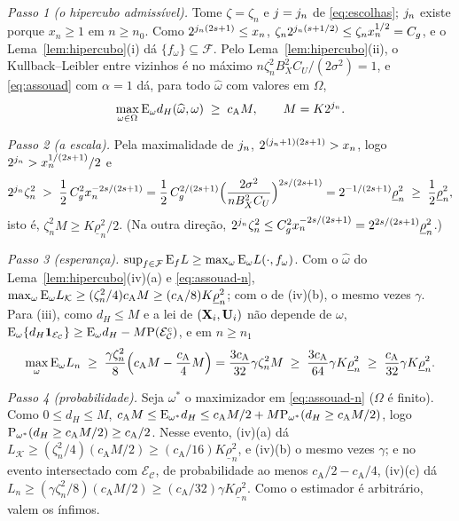 \documentclass[11pt,a4paper]{article}
\newcommand{\Fcal}{\mathcal{F}}
\newcommand{\dH}{d_{H}}
\newcommand{\rlow}{\underline{\rho}_{n}}
\newcommand{\cA}{c_{\mathrm{A}}}
\newcommand{\ECc}{\mathcal{E}_{\mathcal{C}}}
\newcommand{\Lk}{L_{\mathcal{K}}}
\begin{document}
\emph{Passo 1 (o hipercubo admissível).} Tome $\zeta = \zeta_{n}$ e $j =
j_{n}$ de \eqref{eq:escolhas}; $j_{n}$ existe porque $x_{n} \ge 1$ em
$n \ge n_{0}$. Como $2^{j_{n}(2s+1)} \le x_{n}$,
$\zeta_{n}2^{j_{n}(s+1/2)} \le \zeta_{n}x_{n}^{1/2} = C_{g}$, e o
Lema~\ref{lem:hipercubo}(i) dá $\{f_{\omega}\} \subseteq \Fcal$. Pelo
Lema~\ref{lem:hipercubo}(ii), o Kullback--Leibler entre vizinhos é no máximo
$n\zeta_{n}^{2}B_{X}^{2}C_{U}/(2\sigma^{2}) = 1$, e \eqref{eq:assouad} com
$\alpha = 1$ dá, para todo $\widehat\omega$ com valores em $\Omega$,
\begin{equation}
  \label{eq:assouad-n}
  \max_{\omega\in\Omega}\E_{\omega}\dH(\widehat\omega,\omega) \;\ge\; \cA M,
  \qquad M = K2^{\lev_{n}}.
\end{equation}

\emph{Passo 2 (a escala).} Pela maximalidade de $j_{n}$,
$2^{(j_{n}+1)(2s+1)} > x_{n}$, logo $2^{j_{n}} > x_{n}^{1/(2s+1)}/2$ e
\[
  2^{\lev_{n}}\zeta_{n}^{2} \;>\; \frac12\,C_{g}^{2}x_{n}^{-2s/(2s+1)}
  = \frac12\,C_{g}^{2/(2s+1)}\Bigl(\frac{2\sigma^{2}}{nB_{X}^{2}C_{U}}\Bigr)^{2s/(2s+1)}
  = 2^{-1/(2s+1)}\rlow^{2} \;\ge\; \frac12\rlow^{2},
\]
isto é, $\zeta_{n}^{2}M \ge K\rlow^{2}/2$. (Na outra direção,
$2^{\lev_{n}}\zeta_{n}^{2} \le C_{g}^{2}x_{n}^{-2s/(2s+1)} =
2^{2s/(2s+1)}\rlow^{2}$.)

\emph{Passo 3 (esperança).} $\sup_{f\in\Fcal}\E_{f}L \ge
\max_{\omega}\E_{\omega}L(\cdot,f_{\omega})$. Com o $\widehat\omega$ do
Lema~\ref{lem:hipercubo}(iv)(a) e \eqref{eq:assouad-n},
$\max_{\omega}\E_{\omega}\Lk \ge (\zeta_{n}^{2}/4)\cA M \ge
(\cA/8)K\rlow^{2}$; com o de (iv)(b), o mesmo vezes $\gamma$. Para (iii),
como $\dH \le M$ e a lei de $(\mathbf{X}_{i},\mathbf{U}_{i})$ não depende de $\omega$,
$\E_{\omega}\{\dH\mathbf{1}_{\ECc}\} \ge \E_{\omega}\dH - M\Prob(\ECc^{c})$, e
em $n \ge n_{1}$
\[
  \max_{\omega}\E_{\omega}L_{n} \;\ge\; \frac{\gamma\zeta_{n}^{2}}{8}
  \Bigl(\cA M - \frac{\cA}{4}M\Bigr) = \frac{3\cA}{32}\gamma\zeta_{n}^{2}M
  \;\ge\; \frac{3\cA}{64}\gamma K\rlow^{2} \;\ge\; \frac{\cA}{32}\gamma K\rlow^{2}.
\]

\emph{Passo 4 (probabilidade).} Seja $\omega^{*}$ o maximizador em
\eqref{eq:assouad-n} ($\Omega$ é finito). Como $0 \le \dH \le M$,
$\cA M \le \E_{\omega^{*}}\dH \le \cA M/2 + M\Prob_{\omega^{*}}(\dH \ge \cA
M/2)$, logo $\Prob_{\omega^{*}}(\dH \ge \cA M/2) \ge \cA/2$. Nesse evento,
(iv)(a) dá $\Lk \ge (\zeta_{n}^{2}/4)(\cA M/2) \ge (\cA/16)K\rlow^{2}$, e
(iv)(b) o mesmo vezes $\gamma$; e no evento intersectado com $\ECc$, de
probabilidade ao menos $\cA/2 - \cA/4$, (iv)(c) dá $L_{n} \ge
(\gamma\zeta_{n}^{2}/8)(\cA M/2) \ge (\cA/32)\gamma K\rlow^{2}$. Como o
estimador é arbitrário, valem os ínfimos.
\end{document}
